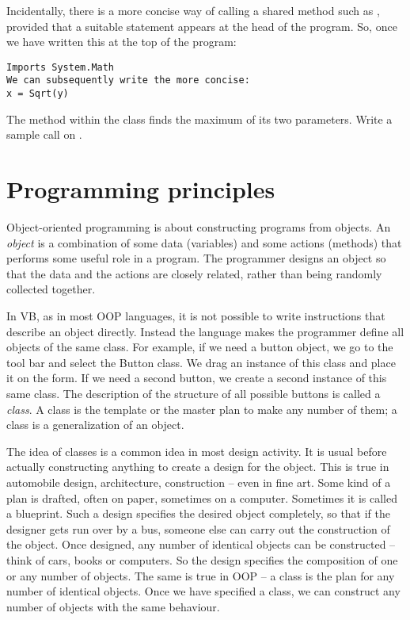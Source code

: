 		Incidentally, there is a more concise way of calling a shared method such as , provided that a suitable  statement appears at the head of the program. So, once we have written this at the top of the program:
		\begin{lstlisting}
Imports System.Math
We can subsequently write the more concise:
x = Sqrt(y)
		\end{lstlisting}

		\begin{stqb}
			\begin{STQ}
				\item The  method  within the class  finds the maximum of its two  parameters. Write a sample call on .
			\end{STQ}
		\end{stqb}


	\section{Programming principles}
	Object-oriented programming is about constructing programs from objects. An \emph{object} is a combination of some data (variables) and some actions (methods) that performs some useful role in a program. The programmer designs an object so that the data and the actions are closely related, rather than being randomly collected together.
		
	In VB, as in most OOP languages, it is not possible to write instructions that describe an object directly. Instead the language makes the programmer define all objects of the same class. For example, if we need a button object, we go to the tool bar and select the Button class. We drag an instance of this class and place it on the form. If we need a second button, we create a second instance of this same class. The description of the structure of all possible buttons is called a \emph{class}. A class is the template or the master plan to make any number of them; a class is a generalization of an object.
		
		The idea of classes is a common idea in most design activity. It is usual before actually constructing anything to create a design for the object. This is true in automobile design, architecture, construction – even in fine art. Some kind of a plan is drafted, often on paper, sometimes on a computer. Sometimes it is called a blueprint. Such a design specifies the desired object completely, so that if the designer gets run over by a bus, someone else can carry out the construction of the object. Once designed, any number of identical objects can be constructed – think of cars, books or computers. So the design specifies the composition of one or any number of objects. The same is true in OOP – a class is the plan for any number of identical objects. Once we have specified a class, we can construct any number of objects with the same behaviour.
		

